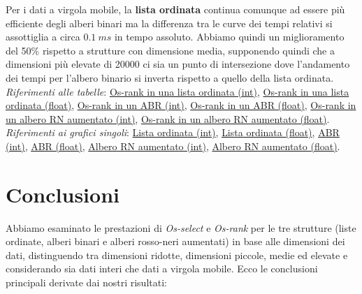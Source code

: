 \documentclass[onecolumn]{article}
\begin{document}
Per i dati a virgola mobile, la \textbf{lista ordinata }continua comunque ad essere più efficiente degli alberi binari ma la differenza tra le curve dei tempi relativi si assottiglia a circa \(0.1\:ms\) in tempo assoluto. Abbiamo quindi un miglioramento del 50\% rispetto a strutture con dimensione media, supponendo quindi che a dimensioni più elevate di 20000 ci sia un punto di intersezione dove l'andamento dei tempi per l'albero binario si inverta rispetto a quello della lista ordinata. 
\newline
\newline
\textit{Riferimenti alle tabelle}: \hyperref[label:lista-ordinata-l-os-rank]{Os-rank in una lista ordinata (int)}, \hyperref[label:lista-ordinata-l-float-os-rank]{Os-rank in una lista ordinata (float)}, \hyperref[label:abr-l-os-rank]{Os-rank in un ABR (int)}, \hyperref[label:abr-l-float-os-rank]{Os-rank in un ABR (float)}, \hyperref[label:rn-aumentato-l-os-rank]{Os-rank in un albero RN aumentato (int)}, \hyperref[label:rn-aumentato-l-float-os-rank]{Os-rank in un albero RN aumentato (float)}.
\newline
\newline
\textit{Riferimenti ai grafici singoli}: \hyperref[label:lista-ordinata-l]{Lista ordinata (int)}, \hyperref[label:lista-ordinata-l-float]{Lista ordinata (float)}, \hyperref[label:abr-l]{ABR (int)}, \hyperref[label:abr-l-float]{ABR (float)}, \hyperref[label:rn-aumentato-l]{Albero RN aumentato (int)}, \hyperref[label:rn-aumentato-l-float]{Albero RN aumentato (float)}.

\newpage
\section{Conclusioni}

Abbiamo esaminato le prestazioni di \textit{Os-select} e \textit{Os-rank} per le tre strutture (liste ordinate, alberi binari e alberi rosso-neri aumentati) in base alle dimensioni dei dati, distinguendo tra dimensioni ridotte, dimensioni piccole, medie ed elevate e considerando sia dati interi che dati a virgola mobile. Ecco le conclusioni principali derivate dai nostri risultati:
\end{document}
